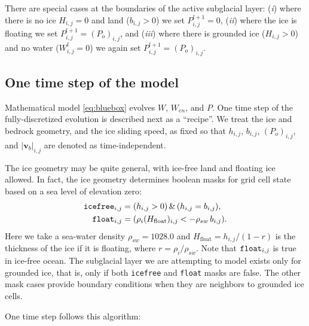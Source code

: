 \documentclass[11pt,final]{amsart}
\newcommand\bv{\mathbf{v}}
\begin{document}
There are special cases at the boundaries of the active subglacial layer: (\emph{i}) where there is no ice $H_{i,j}=0$ and land ($b_{i,j}>0$) we set $P_{i,j}^{l+1}=0$, (\emph{ii}) where the ice is floating we set $P_{i,j}^{l+1}=(P_o)_{i,j}$, and (\emph{iii}) where there is grounded ice ($H_{i,j}>0$) and no water ($W_{i,j}^l=0$) we again set $P_{i,j}^{l+1}=(P_o)_{i,j}$. 

\subsection*{One time step of the model}  Mathematical model \eqref{eq:bluebox} evolves $W$, $W_{en}$, and $P$.  One time step of the fully-discretized evolution is described next as a ``recipe''.  We treat the ice and bedrock geometry, and the ice sliding speed, as fixed so that $h_{i,j}$, $b_{i,j}$, $(P_o)_{i,j}$, and $|\bv_b|_{i,j}$ are denoted as time-independent.

The ice geometry may be quite general, with ice-free land and floating ice allowed.  In fact, the ice geometry determines boolean masks for grid cell state based on a sea level of elevation zero:
\begin{align*}
\text{\texttt{icefree}}_{i,j} &= (h_{i,j} > 0)\, \&\, (h_{i,j} = b_{i,j}), \\
\text{\texttt{float}}_{i,j}   &= (\rho_i (H_{\text{float}})_{i,j} < - \rho_{sw}\, b_{i,j}).
\end{align*}
Here we take a sea-water density $\rho_{sw}=1028.0$ and $H_{\text{float}}=h_{i,j} / (1 - r)$  is the thickness of the ice if it is floating, where $r=\rho_i / \rho_{sw}$.  Note that $\text{\texttt{float}}_{i,j}$ is true in ice-free ocean.  The subglacial layer we are attempting to model exists only for grounded ice, that is, only if both \texttt{icefree} and \texttt{float} masks are false.  The other mask cases provide boundary conditions when they are neighbors to grounded ice cells.

One time step follows this algorithm:
\end{document}

